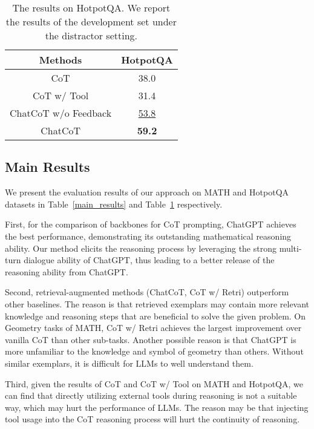 \begin{table}
    \centering
    \begin{tabular}{cc}
        \bottomrule
        \textbf{Methods} & \textbf{HotpotQA} \\
        \hline
        CoT & 38.0 \\
        CoT w/ Tool & 31.4 \\
        ChatCoT w/o Feedback & \underline{53.8} \\
        ChatCoT & \textbf{59.2} \\
        \bottomrule
    \end{tabular}
    \caption{The results on HotpotQA. We report the results of the development set under the distractor setting.}
    \label{hotpotqa}
\end{table}

\subsection{Main Results}

We present the evaluation results of our approach on MATH and HotpotQA datasets in Table~\ref{main_results} and Table~\ref{hotpotqa} respectively.

First, for the comparison of backbones for CoT prompting, ChatGPT achieves the best performance, demonstrating its outstanding mathematical reasoning ability.
Our method elicits the reasoning process by leveraging the strong multi-turn dialogue ability of ChatGPT, thus leading to a better release of the reasoning ability from ChatGPT.

Second, retrieval-augmented methods (\eg ChatCoT, CoT w/ Retri) outperform other baselines.
The reason is that retrieved exemplars may contain more relevant knowledge and reasoning steps that are beneficial to solve the given problem.
On Geometry tasks of MATH, CoT w/ Retri achieves the largest improvement over vanilla CoT than other sub-tasks.
Another possible reason is that ChatGPT is more unfamiliar to the knowledge and symbol of geometry than others.
Without similar exemplars, it is difficult for LLMs to well understand them.

Third, given the results of CoT and CoT w/ Tool on MATH and HotpotQA, we can find that directly utilizing external tools during reasoning is not a suitable way, which may hurt the performance of LLMs.
The reason may be that injecting tool usage into the CoT reasoning process will hurt the continuity of reasoning. %

